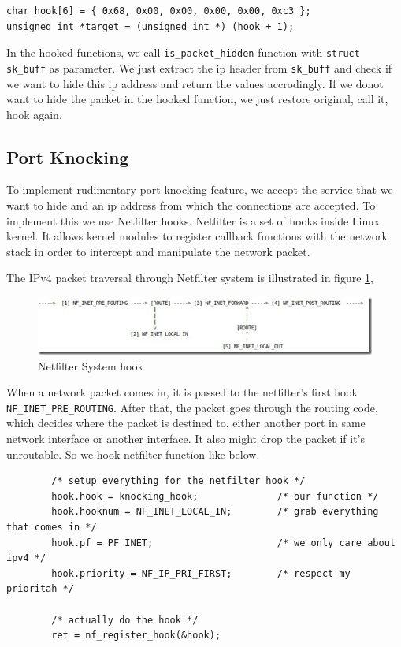 \documentclass[10pt, letterpaper]{scrartcl}
\begin{document}
\begin{verbatim}
char hook[6] = { 0x68, 0x00, 0x00, 0x00, 0x00, 0xc3 };
unsigned int *target = (unsigned int *) (hook + 1);
\end{verbatim} 

In the hooked functions, we call \texttt{is\_packet\_hidden} function with \texttt{struct sk\_buff} as parameter.
We just extract the ip header from \texttt{sk\_buff} and check if we want to hide this ip address and return the values accrodingly. 
If we donot want to hide the packet in the hooked function, we just restore original, call it, hook again. 
  
\subsection{Port Knocking}
To implement rudimentary port knocking feature, we accept the service that we want to hide and an ip address 
from which the connections are accepted. To implement this we use Netfilter hooks. Netfilter is a set of hooks inside Linux kernel. 
It allows kernel modules to register callback functions with the network stack in order to intercept and manipulate the network packet.

The IPv4 packet traversal through Netfilter system is illustrated in figure \ref{netfilter}, 
\begin{figure}
\centerline{
\includegraphics[width=1.0\columnwidth]{netfilter.jpg}
}
\caption{Netfilter System hook}
\label{netfilter}
\end{figure}

When a network packet comes in, it is passed to the netfilter’s first hook \texttt{NF\_INET\_PRE\_ROUTING}. After that, the packet goes through the routing code, which decides where the packet is destined to, either another port in same network interface or another interface. It also might drop the packet if it’s unroutable. So we hook netfilter function like below. 

\begin{verbatim}
        /* setup everything for the netfilter hook */
        hook.hook = knocking_hook;              /* our function */
        hook.hooknum = NF_INET_LOCAL_IN;        /* grab everything that comes in */
        hook.pf = PF_INET;                      /* we only care about ipv4 */
        hook.priority = NF_IP_PRI_FIRST;        /* respect my prioritah */

        /* actually do the hook */
        ret = nf_register_hook(&hook);
\end{verbatim} 
\end{document}
